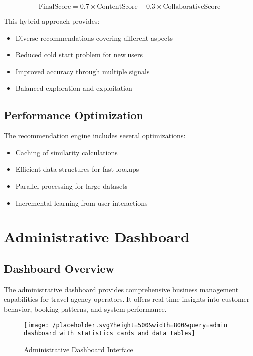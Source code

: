 \documentclass[12pt,a4paper]{article}
\begin{document}
$$\text{FinalScore} = 0.7 \times \text{ContentScore} + 0.3 \times \text{CollaborativeScore}$$

This hybrid approach provides:
\begin{itemize}
    \item Diverse recommendations covering different aspects
    \item Reduced cold start problem for new users
    \item Improved accuracy through multiple signals
    \item Balanced exploration and exploitation
\end{itemize}

\subsection{Performance Optimization}
The recommendation engine includes several optimizations:
\begin{itemize}
    \item Caching of similarity calculations
    \item Efficient data structures for fast lookups
    \item Parallel processing for large datasets
    \item Incremental learning from user interactions
\end{itemize}

\newpage

\section{Administrative Dashboard}

\subsection{Dashboard Overview}
The administrative dashboard provides comprehensive business management capabilities for travel agency operators. It offers real-time insights into customer behavior, booking patterns, and system performance.

\begin{figure}[H]
    \centering
    \texttt{[image: /placeholder.svg?height=500\&width=800\&query=admin dashboard with statistics cards and data tables]}
    \caption{Administrative Dashboard Interface}
    \label{fig:admin-dashboard}
\end{figure}
\end{document}
